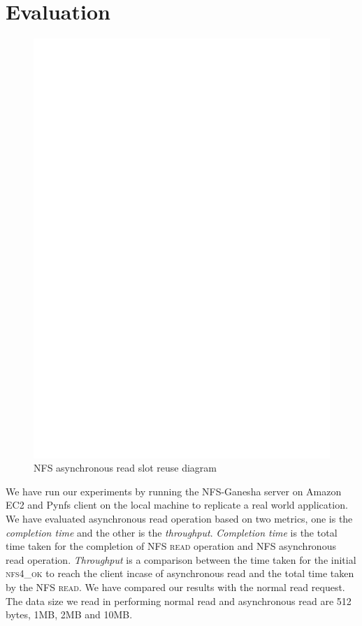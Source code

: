 \section{Evaluation}
\label{sec:Evaluation}

\begin{figure}
\centering
\includegraphics[scale=0.7]{figures/Slotreuse.eps}
\caption{NFS asynchronous read slot reuse diagram}
\label{fig:NFSSlotreuse}
\end{figure}


	We have run our experiments by running the NFS-Ganesha server on Amazon EC2 and Pynfs client on the local machine to replicate a real world application.  We have evaluated asynchronous read operation based on two metrics, one is the \textit{completion time} and the other is the \textit{throughput}. \textit{Completion time} is the total time taken for the completion of \textsc{NFS read} operation and NFS asynchronous read operation. \textit{Throughput} is a comparison between the time taken for the initial \textsc{nfs4\_ok} to reach the client incase of asynchronous read and the total time taken by the \textsc{NFS read}. We have compared our results with the normal read request. The data size we read in performing normal read and asynchronous read are 512 bytes, 1MB, 2MB and 10MB. 



